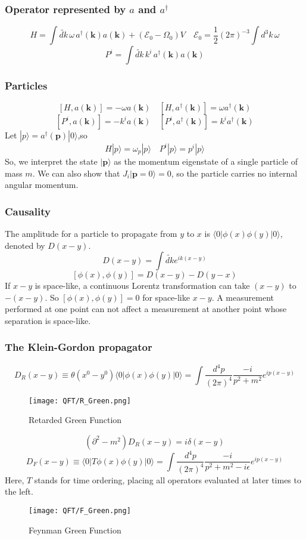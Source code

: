 \subsubsection{Operator represented by $a$ and $a^{\dagger}$}
\[H=\int \widetilde{dk}\, \omega\, a^{\dagger}(\bm{k})a(\bm{k}) + (\mathcal{E}_0 - \Omega_0)V \quad \mathcal{E}_0 = \frac{1}{2}(2\pi)^{-3}\int d^3 k \,\omega\]
\[P^{i}=\int \widetilde{dk}\, k^{i}\, a^{\dagger}(\bm{k})a(\bm{k}) \]
\subsubsection{Particles}
\[[H,a(\bm{k})] = -\omega a(\bm{k}) \quad [H,a^{\dagger}(\bm{k})] = \omega a^{\dagger}(\bm{k})\]
\[[P^i,a(\bm{k})] = -k^i a(\bm{k}) \quad [P^i,a^{\dagger}(\bm{k})] = k^i a^{\dagger}(\bm{k})\]
Let $|p\rangle = a^{\dagger}(\bm{p})|0\rangle $,so
\[H |p\rangle = \omega_p|p\rangle \quad P^i |p\rangle = p^i|p\rangle\]
So, we interpret the state $|\bm{p}\rangle$ as the momentum eigenstate of a single particle of mass $m$. We can also show that 
$J_i|\bm{p} = 0\rangle = 0$, so the particle carries no internal angular momentum.
\subsubsection{Causality}
\noindent
The amplitude for a particle to propagate from $y$ to $x$ is $\langle 0 | \phi(x) \phi(y) | 0 \rangle$, denoted by $D(x-y)$.
\[D(x-y) = \int \widetilde{dk} e^{ik(x-y)}\]
\[[\phi(x),\phi(y)] = D(x-y) -D(y-x)\]
If $x-y$ is space-like, a continuous Lorentz transformation can take $(x-y)$ to $-(x-y)$. So $[\phi(x),\phi(y)] =0$ for space-like $x-y$. A measurement performed at one point can not affect a measurement at another point whose separation is space-like.
\subsubsection{The Klein-Gordon propagator}
\[D_R(x-y) \equiv \theta(x^0-y^0) \langle 0 | \phi(x) \phi(y) | 0 \rangle = \int \frac{d^4 p}{(2\pi)^4} \frac{-i}{p^2+m^2} e^{ip(x-y)}\]
\begin{figure}[!h]
\centering
\texttt{[image: QFT/R\_Green.png]}
\caption{Retarded Green Function}
\end{figure}
\[(\partial^2-m^2) D_R(x-y) = i \delta(x-y)\]
\[D_F(x-y) \equiv \langle 0 | T\phi(x) \phi(y) | 0 \rangle = \int \frac{d^4 p}{(2\pi)^4} \frac{-i}{p^2+m^2-i\epsilon} e^{ip(x-y)}\]
Here, $T$ stands for time ordering, placing all operators evaluated at later times to the left.
\begin{figure}[!h]
\centering
\texttt{[image: QFT/F\_Green.png]}
\caption{Feynman Green Function}
\end{figure}

